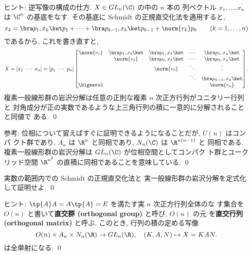 \documentclass[12pt,twoside]{jarticle}
\begin{document}
\noindent
ヒント:  逆写像の構成の仕方. $X\in GL_n(\C)$ の中の $n$ 本の
列ベクトル $x_1,\dots,x_n$ は $\C^n$ の基底をなす. 
その基底に Schmidt の正規直交化法を適用すると,
\begin{equation*}
  x_k = \bra p_1,x_k\ket p_1 + \cdots + \bra p_{k-1},x_k\ket p_{k-1} +\norm{v_k} p_k 
  \qquad (k=1,\dots,n)
\end{equation*}
であるから, これを書き直すと,
\begin{equation*}
  X = [x_1\ \cdots\ x_n] =
  [p_1\ \cdots\ p_n]
  \begin{bmatrix}
    \norm{v_1} & \bra p_1,x_2\ket & \bra p_1,x_3\ket & \cdots & \bra p_1,x_n\ket \\
               & \norm{v_2}       & \bra p_2,x_3\ket & \cdots & \bra p_2,x_n\ket \\
               &                  & \norm{v_3}       & \ddots & \vdots \\
               &                  &                  & \ddots & \bra p_{n-1},x_n\ket \\
    \bigzerol  &                  &                  &        & \norm{v_n} \\
  \end{bmatrix}.
\end{equation*}
複素一般線形群の岩沢分解は任意の正則な複素 $n$ 次正方行列がユニタリー行列と
対角成分が正の実数であるような上三角行列の積に一意的に分解されることと同値で
ある. 
\qed

\medskip
\noindent
参考: 位相について習えばすぐに証明できるようになることだが, $U(n)$ はコンパ
クト群であり, $A_n$ は $\R^n$ と同相であり, $N_n(\C)$ は $\R^{n(n-1)}$ と
同相である.  複素一般線形群の岩沢分解は $GL_n(\C)$ が位相空間としてコンパク
ト群とユークリッド空間 $\R^{n^2}$ の直積に同相であることを意味している.
\qed


\begin{question}
\label{q:iwasawa-decomp-GLn(R)}
  実数の範囲内での Schmidt の正規直交化法と
  実一般線形群の岩沢分解を定式化して証明せよ. \qed
\end{question}

\noindent
ヒント: $\tp{A}A=A\tp{A}=E$ を満たす実 $n$ 次正方行列全体のな
す集合を $O(n)$ と書いて{\bf 直交群 (orthogonal group)} と呼び, $O(n)$ の元
を{\bf 直交行列 (orthogonal matrix)} と呼ぶ.  このとき, 行列の積の定める写像
\begin{equation*}
  O(n)\times A_n \times N_n(\R) \to GL_n(\R),
  \quad (K,A,N) \mapsto X = KAN.
\end{equation*}
は全単射になる.
\qed
\end{document}
